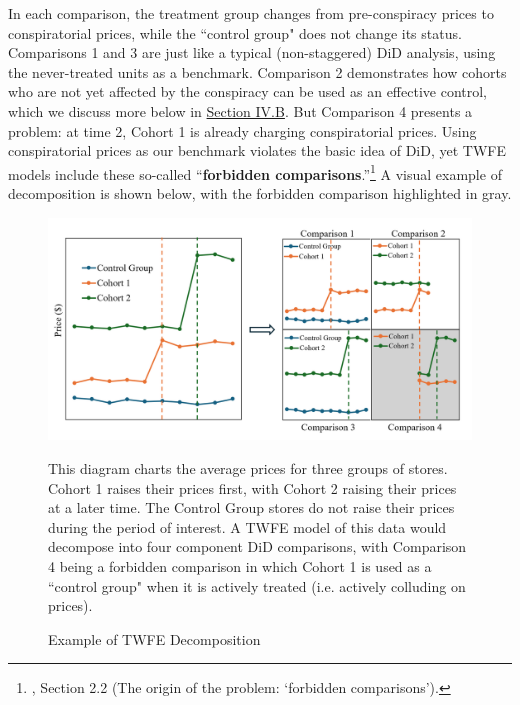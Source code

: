 \documentclass[12pt]{article}
\begin{document}
In each comparison, the treatment group changes from pre-conspiracy prices to conspiratorial prices, while the ``control group" does not change its status. Comparisons 1 and 3 are just like a typical (non-staggered) DiD analysis, using the never-treated units as a benchmark. Comparison 2 demonstrates how cohorts who are not yet affected by the conspiracy can be used as an effective control, which we discuss more below in \hyperref[sec:notyettreated]{Section IV.B}. But Comparison 4 presents a problem: at time 2, Cohort 1 is already charging conspiratorial prices. Using conspiratorial prices as our benchmark violates the basic idea of DiD, yet TWFE models include these so-called “\textbf{forbidden comparisons}.”\footnote{\citet{de2023two}, Section 2.2 (The origin of the problem: ‘forbidden comparisons’).} A visual example of decomposition is shown below, with the forbidden comparison highlighted in gray.

\begin{figure}[H]
    \centering
    \caption{Example of TWFE Decomposition}
    \includegraphics[width=5in]{Figures/DiD Decomposition Diagram.PNG}
    \label{fig:decomp}
    \vspace{3mm}
    \footnotesize \begin{singlespace*}
        \parbox{5.5in}{This diagram charts the average prices for three groups of stores. Cohort 1 raises their prices first, with Cohort 2 raising their prices at a later time. The Control Group stores do not raise their prices during the period of interest. A TWFE model of this data would decompose into four component DiD comparisons, with Comparison 4 being a forbidden comparison in which Cohort 1 is used as a ``control group" when it is actively treated (i.e. actively colluding on prices).}
    \end{singlespace*}
\end{figure}
\end{document}

